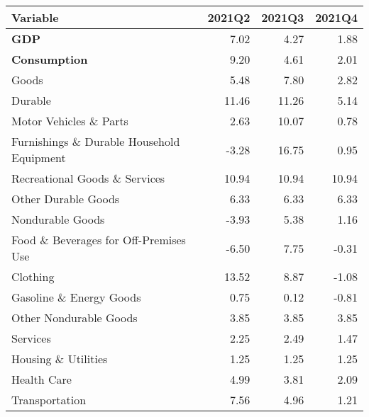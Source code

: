\documentclass[11pt, letterpaper]{article}\usepackage[]{graphicx}\usepackage[]{color}
\begin{document}
\begin{table}[H]
\centering
\begingroup\fontsize{10pt}{12pt}\selectfont
\begin{tabular}{lrrr}
  \hline
Variable & 2021Q2 & 2021Q3 & 2021Q4 \\ 
  \hline
\hspace{0mm} \textbf{GDP} & 7.02 & 4.27 & 1.88 \\ 
  \hspace{0mm} \textbf{Consumption} & 9.20 & 4.61 & 2.01 \\ 
  \hspace{8mm}  Goods & 5.48 & 7.80 & 2.82 \\ 
  \hspace{16mm}  Durable & 11.46 & 11.26 & 5.14 \\ 
  \hspace{24mm}  Motor Vehicles \& Parts & 2.63 & 10.07 & 0.78 \\ 
  \hspace{24mm}  Furnishings \& Durable Household Equipment & -3.28 & 16.75 & 0.95 \\ 
  \hspace{24mm}  Recreational Goods \& Services & 10.94 & 10.94 & 10.94 \\ 
  \hspace{24mm}  Other Durable Goods & 6.33 & 6.33 & 6.33 \\ 
  \hspace{16mm}  Nondurable Goods & -3.93 & 5.38 & 1.16 \\ 
  \hspace{24mm}  Food \& Beverages for Off-Premises Use & -6.50 & 7.75 & -0.31 \\ 
  \hspace{24mm}  Clothing & 13.52 & 8.87 & -1.08 \\ 
  \hspace{24mm}  Gasoline \& Energy Goods & 0.75 & 0.12 & -0.81 \\ 
  \hspace{24mm}  Other Nondurable Goods & 3.85 & 3.85 & 3.85 \\ 
  \hspace{8mm}  Services & 2.25 & 2.49 & 1.47 \\ 
  \hspace{16mm}  Housing \& Utilities & 1.25 & 1.25 & 1.25 \\ 
  \hspace{16mm}  Health Care & 4.99 & 3.81 & 2.09 \\ 
  \hspace{16mm}  Transportation & 7.56 & 4.96 & 1.21 \\ 

\end{tabular}
\end{table}
\end{document}
